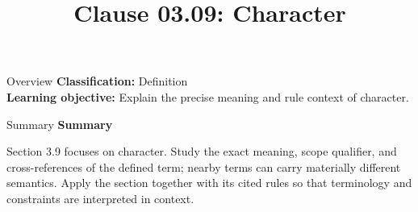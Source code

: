 \documentclass[10pt,letterpaper]{article}
\title{Clause 03.09: Character}
\author{}
\date{}
\begin{document}
\maketitle
\begin{CornellOverviewBox}{Overview}
\textbf{Classification:} Definition\\[2pt]
\textbf{Learning objective:} Explain the precise meaning and rule context of character.
\end{CornellOverviewBox}\begin{CornellSummaryBox}{Summary}
{\sffamily\bfseries\color{Accent} Summary}\par\vspace{3pt}Section 3.9 focuses on character. Study the exact meaning, scope qualifier, and cross-references of the defined term; nearby terms can carry materially different semantics. Apply the section together with its cited rules so that terminology and constraints are interpreted in context.
\end{CornellSummaryBox}
\end{document}
